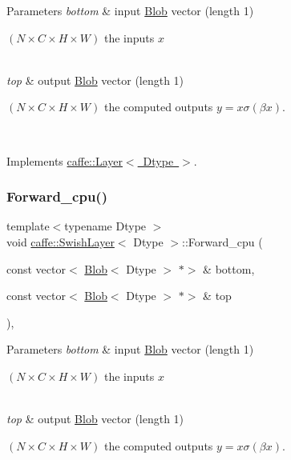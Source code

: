 \begin{DoxyParams}{Parameters}
{\em bottom} & input \mbox{\hyperlink{classcaffe_1_1_blob}{Blob}} vector (length 1)
\begin{DoxyEnumerate}
\item $ (N \times C \times H \times W) $ the inputs $ x $ 
\end{DoxyEnumerate}\\
\hline
{\em top} & output \mbox{\hyperlink{classcaffe_1_1_blob}{Blob}} vector (length 1)
\begin{DoxyEnumerate}
\item $ (N \times C \times H \times W) $ the computed outputs $ y = x \sigma (\beta x) $. 
\end{DoxyEnumerate}\\
\hline
\end{DoxyParams}


Implements \mbox{\hyperlink{classcaffe_1_1_layer_a576ac6a60b1e99fe383831f52a6cea77}{caffe\+::\+Layer$<$ Dtype $>$}}.

\mbox{\label{classcaffe_1_1_swish_layer_a8a4567761bcce6d0283d305922d586cc}} 
\subsubsection{\texorpdfstring{Forward\+\_\+cpu()}{Forward\_cpu()}\hspace{0.1cm}{\footnotesize\ttfamily [2/2]}}
{\footnotesize\ttfamily template$<$typename Dtype $>$ \\
void \mbox{\hyperlink{classcaffe_1_1_swish_layer}{caffe\+::\+Swish\+Layer}}$<$ Dtype $>$\+::Forward\+\_\+cpu (\begin{DoxyParamCaption}\item[{const vector$<$ \mbox{\hyperlink{classcaffe_1_1_blob}{Blob}}$<$ Dtype $>$ $\ast$$>$ \&}]{bottom,  }\item[{const vector$<$ \mbox{\hyperlink{classcaffe_1_1_blob}{Blob}}$<$ Dtype $>$ $\ast$$>$ \&}]{top }\end{DoxyParamCaption})\hspace{0.3cm}{\ttfamily [protected]}, {\ttfamily [virtual]}}


\begin{DoxyParams}{Parameters}
{\em bottom} & input \mbox{\hyperlink{classcaffe_1_1_blob}{Blob}} vector (length 1)
\begin{DoxyEnumerate}
\item $ (N \times C \times H \times W) $ the inputs $ x $ 
\end{DoxyEnumerate}\\
\hline
{\em top} & output \mbox{\hyperlink{classcaffe_1_1_blob}{Blob}} vector (length 1)
\begin{DoxyEnumerate}
\item $ (N \times C \times H \times W) $ the computed outputs $ y = x \sigma (\beta x) $. 
\end{DoxyEnumerate}\\
\hline
\end{DoxyParams}


